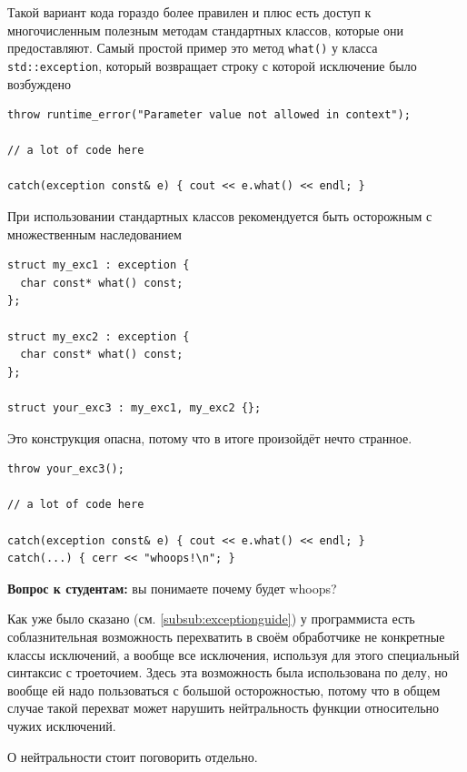 \documentclass[a4paper,12pt,oneside]{article}
\newif\ifanswers
\begin{document}
Такой вариант кода гораздо более правилен и плюс есть доступ к многочисленным полезным методам стандартных классов, которые они предоставляют. Самый простой пример это метод \lstinline!what()! у класса \lstinline!std::exception!, который возвращает строку с которой исключение было возбуждено

\begin{lstlisting}
throw runtime_error("Parameter value not allowed in context");

// a lot of code here

catch(exception const& e) { cout << e.what() << endl; }
\end{lstlisting}

При использовании стандартных классов рекомендуется быть осторожным с множественным наследованием

\begin{lstlisting}
struct my_exc1 : exception {
  char const* what() const;
};

struct my_exc2 : exception {
  сhar const* what() const;
};

struct your_exc3 : my_exc1, my_exc2 {};
\end{lstlisting}

Это конструкция опасна, потому что в итоге произойдёт нечто странное.

\begin{lstlisting}
throw your_exc3();

// a lot of code here

catch(exception const& e) { cout << e.what() << endl; }
catch(...) { cerr << "whoops!\n"; }
\end{lstlisting}

\textbf{Вопрос к студентам:} вы понимаете почему будет whoops?

\ifanswers
Правильный ответ: неоднозначный выбор из двух копий верхнего базового класса. Выход разумеется в виртуальном наследовании.
\fi

Как уже было сказано (см. \ref{subsub:exceptionguide}) у программиста есть соблазнительная возможность перехватить в своём обработчике не конкретные классы исключений, а вообще все исключения, используя для этого специальный синтаксис с троеточием. Здесь эта возможность была использована по делу, но вообще ей надо пользоваться с большой осторожностью, потому что в общем случае такой перехват может нарушить нейтральность функции относительно чужих исключений.

О нейтральности стоит поговорить отдельно.
\end{document}

